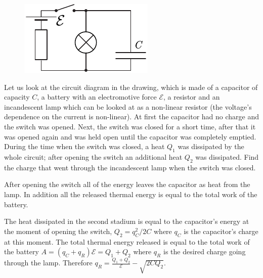 {\ifEngStatement
\begin{figure}
\vspace{-10pt}
\begin{center}
\includegraphics[width=\linewidth]{2018-v3g-09-LC-Q}
\par\end{center} 
\end{figure}
Let us look at the circuit diagram in the drawing, which is made of a capacitor of capacity $C$, a battery with an electromotive force $\mathcal{E}$, a resistor and an incandescent lamp which can be looked at as a non-linear resistor (the voltage’s dependence on the current is non-linear). At first the capacitor had no charge and the switch was opened. Next, the switch was closed for a short time, after that it was opened again and was held open until the capacitor was completely emptied. During the time when the switch was closed, a heat $Q_1$ was dissipated by the whole circuit; after opening the switch an additional heat $Q_2$ was dissipated. Find the charge that went through the incandescent lamp when the switch was closed.
\fi


\ifEngHint
After opening the switch all of the energy leaves the capacitor as heat from the lamp. In addition all the released thermal energy is equal to the total work of the battery.
\fi


\ifEngSolution
The heat dissipated in the second stadium is equal to the capacitor’s energy at the moment of opening the switch, $Q_2=q_C^2/2C$ where $q_C$ is the capacitor’s charge at this moment. The total thermal energy released is equal to the total work of the battery $A=(q_C+q_R)\mathcal E=Q_1+Q_2$ where $q_R$ is the desired charge going through the lamp. Therefore $q_R=\frac{Q_1+Q_2}{\mathcal E}-\sqrt{2CQ_2}$.
\fi
}